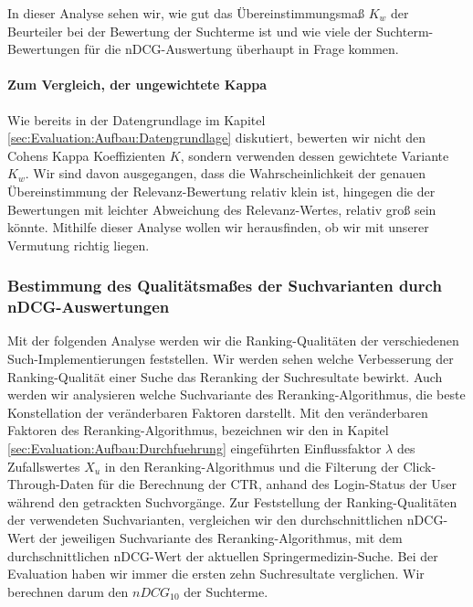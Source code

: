 In dieser Analyse sehen wir, wie gut das Übereinstimmungsmaß $K_w$ der Beurteiler bei der Bewertung der Suchterme ist und wie viele der Suchterm-Bewertungen für die nDCG-Auswertung überhaupt in Frage kommen. 



\paragraph{Zum Vergleich, der ungewichtete Kappa}
Wie bereits in der Datengrundlage im Kapitel \ref{sec:Evaluation:Aufbau:Datengrundlage} diskutiert, bewerten wir nicht den Cohens Kappa Koeffizienten $K$, sondern verwenden dessen gewichtete Variante $K_w$. Wir sind davon ausgegangen, dass die Wahrscheinlichkeit der genauen Übereinstimmung der Relevanz-Bewertung relativ klein ist, hingegen die der Bewertungen mit leichter Abweichung des Relevanz-Wertes, relativ groß sein könnte. Mithilfe dieser Analyse wollen wir herausfinden, ob wir mit unserer Vermutung richtig liegen.



\subsubsection{Bestimmung des Qualitätsmaßes der Suchvarianten durch nDCG-Auswertungen}
\label{sec:Evaluation:Auswertung:QuantitativeAuswertung:nDCG}

Mit der folgenden Analyse werden wir die Ranking-Qualitäten der verschiedenen Such-Implementierungen feststellen. Wir werden sehen welche Verbesserung der Ranking-Qualität einer Suche das Reranking der Suchresultate bewirkt. Auch werden wir analysieren welche Suchvariante des Reranking-Algorithmus, die beste Konstellation der veränderbaren Faktoren darstellt. Mit den veränderbaren Faktoren des Reranking-Algorithmus, bezeichnen wir den in Kapitel \ref{sec:Evaluation:Aufbau:Durchfuehrung} eingeführten Einflussfaktor $\lambda$ des Zufallswertes $X_u$ in den Reranking-Algorithmus und die Filterung der Click-Through-Daten für die Berechnung der CTR, anhand des Login-Status der User während den getrackten Suchvorgänge. Zur Feststellung der Ranking-Qualitäten der verwendeten Suchvarianten, vergleichen wir den durchschnittlichen nDCG-Wert der jeweiligen Suchvariante des Reranking-Algorithmus, mit dem durchschnittlichen nDCG-Wert der aktuellen Springermedizin-Suche. Bei der Evaluation haben wir immer die ersten zehn Suchresultate verglichen. Wir berechnen darum den $nDCG_{10}$ der Suchterme.


